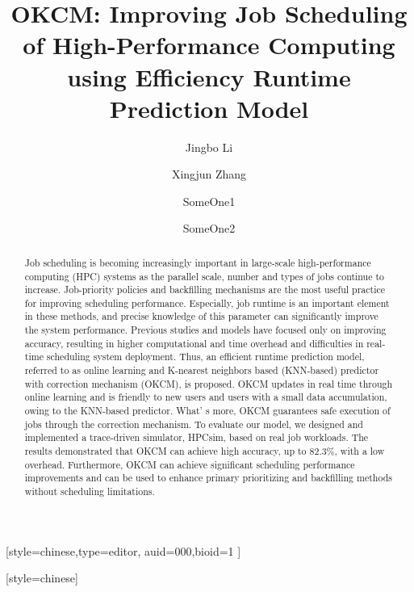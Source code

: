 \documentclass[a4paper,fleqn]{cas-sc}
\begin{document}
\let\WriteBookmarks\relax
\def\floatpagepagefraction{1}
\def\textpagefraction{.001}

\title [mode = title]{OKCM: Improving Job Scheduling of High-Performance Computing using Efficiency Runtime Prediction Model}                      
\tnotemark[1]



\author{Jingbo Li}[style=chinese,type=editor,
                        auid=000,bioid=1 ]
                        


\address{School of Computer Science and Technology, Xi'an Jiaotong University, Xi'an 710049, China}


\author{Xingjun Zhang}[style=chinese]
\cormark[1] %

\author{SomeOne1}


\author{SomeOne2}




\begin{abstract}
Job scheduling is becoming increasingly important in large-scale high-performance computing (HPC) systems as the parallel scale, number and types of jobs continue to increase. Job-priority policies and backfilling mechanisms are the most useful practice for improving scheduling performance. Especially, job runtime is an important element in these methods, and precise knowledge of this parameter can significantly improve the system performance. Previous studies and models have focused only on improving accuracy, resulting in higher computational and time overhead and difficulties in real-time scheduling system deployment. Thus, an efficient runtime prediction model, referred to as online learning and K-nearest neighbors based (KNN-based) predictor with correction mechanism (OKCM), is proposed. OKCM updates in real time through online learning and is friendly to new users and users with a small data accumulation, owing to the KNN-based predictor. What’ s more, OKCM guarantees safe execution of jobs through the correction mechanism. To evaluate our model, we designed and implemented a trace-driven simulator, HPCsim, based on real job workloads. The results demonstrated that OKCM can achieve high accuracy, up to 82.3\%, with a low overhead. Furthermore, OKCM can achieve significant scheduling performance improvements and can be used to enhance primary prioritizing and backfilling methods without scheduling limitations.
\end{abstract}
\end{document}
